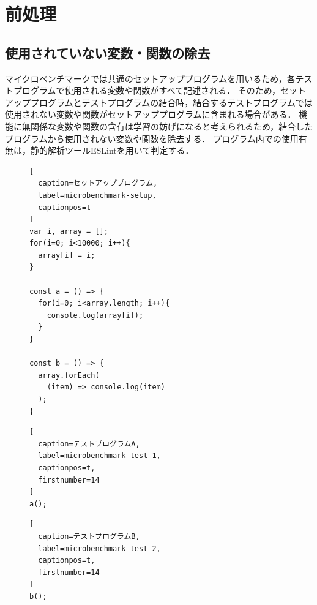 \documentclass[11pt]{jreport}
\begin{document}

\section{前処理}\label{chapter:dataset:prep}




\subsection{使用されていない変数・関数の除去}


マイクロベンチマークでは共通のセットアッププログラムを用いるため，各テストプログラムで使用される変数や関数がすべて記述される．
そのため，セットアッププログラムとテストプログラムの結合時，結合するテストプログラムでは使用されない変数や関数がセットアッププログラムに含まれる場合がある．
機能に無関係な変数や関数の含有は学習の妨げになると考えられるため，結合したプログラムから使用されない変数や関数を除去する．
プログラム内での使用有無は，静的解析ツールESLintを用いて判定する．


\begin{figure}[t]
\captionsetup{name=Listing}
\hspace{0.04\columnwidth}
\begin{minipage}[b]{0.96\linewidth}
\begin{lstlisting}[
  caption=セットアッププログラム,
  label=microbenchmark-setup,
  captionpos=t
]
var i, array = [];
for(i=0; i<10000; i++){
  array[i] = i;
}

const a = () => {
  for(i=0; i<array.length; i++){
    console.log(array[i]);
  }
}

const b = () => {
  array.forEach(
    (item) => console.log(item)
  );
}
\end{lstlisting}
\end{minipage}

\hspace{0.04\columnwidth}
\begin{minipage}[b]{0.445\linewidth}
\begin{lstlisting}[
  caption=テストプログラムA,
  label=microbenchmark-test-1,
  captionpos=t,
  firstnumber=14
]
a();
\end{lstlisting}
\end{minipage}
\hspace{0.059\columnwidth}
\begin{minipage}[b]{0.445\linewidth}
\begin{lstlisting}[
  caption=テストプログラムB,
  label=microbenchmark-test-2,
  captionpos=t,
  firstnumber=14
]
b();
\end{lstlisting}
\end{minipage}
\end{figure}
\end{document}
